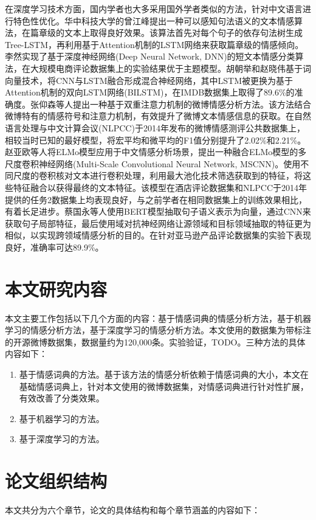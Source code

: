 在深度学习技术方面，国内学者也大多采用国外学者类似的方法，针对中文语言进行特色性优化。华中科技大学的曾江峰\cite{__2019zengjiangfeng}提出一种可以感知句法语义的文本情感算法，在篇章级的文本上取得良好效果。该算法首先对每个句子的依存句法树生成Tree-LSTM，再利用基于Attention机制的LSTM网络来获取篇章级的情感倾向。李然\cite{__2015liran}实现了基于深度神经网络(Deep Neural Network, DNN)的短文本情感分类算法，在大规模电商评论数据集上的实验结果优于主题模型。胡朝举和赵晓伟\cite{胡朝举2018基于词向量技术和混合神经网络的情感分析}基于词向量技术，将CNN与LSTM融合形成混合神经网络，其中LSTM被更换为基于Attention机制的双向LSTM网络(BILSTM)，在IMDB数据集上取得了89.6\%的准确度。张仰森等\cite{张仰森2018基于双重注意力模型的微博情感分析方法}人提出一种基于双重注意力机制的微博情感分析方法。该方法结合微博特有的情感符号和注意力机制，有效提升了微博文本情感信息的获取。在自然语言处理与中文计算会议(NLPCC)于2014年发布的微博情感测评公共数据集上，相较当时已知的最好模型，将宏平均和微平均的F1值分别提升了2.02\%和2.21\%。赵亚欧等\cite{_elmo_nodate}人将ELMo模型应用于中文情感分析场景，提出一种融合ELMo模型的多尺度卷积神经网络(Multi-Scale Convolutional Neural Network, MSCNN)。使用不同尺度的卷积核对文本进行卷积处理，利用最大池化技术筛选获取到的特征，将这些特征融合以获得最终的文本特征。该模型在酒店评论数据集和NLPCC于2014年提供的任务2数据集上均表现良好，与之前学者在相同数据集上的训练效果相比，有着长足进步。蔡国永等\cite{_bert_2020}人使用BERT模型抽取句子语义表示为向量，通过CNN来获取句子局部特征，最后使用域对抗神经网络让源领域和目标领域抽取的特征更为相似，以实现跨领域情感分析的目的。在针对亚马逊产品评论数据集的实验下表现良好，准确率可达89.9\%。

\section{本文研究内容}
本文主要工作包括以下几个方面的内容：基于情感词典的情感分析方法，基于机器学习的情感分析方法，基于深度学习的情感分析方法。本文使用的数据集为带标注的开源微博数据集\cite{数据集}，数据量约为120,000条。实验验证，TODO。三种方法的具体内容如下：
\begin{enumerate}[1)]
\item 基于情感词典的方法。基于该方法的情感分析依赖于情感词典的大小，本文在基础情感词典上，针对本文使用的微博数据集，对情感词典进行针对性扩展，有效改善了分类效果。
\item 基于机器学习的方法。
\item 基于深度学习的方法。
\end{enumerate}

\section{论文组织结构}
本文共分为六个章节，论文的具体结构和每个章节涵盖的内容如下：

